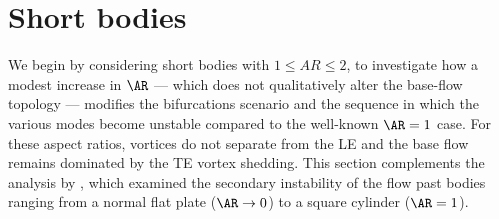 \section{Short bodies}
\label{sec:short}

We begin by considering short bodies with $1 \le AR \le 2$, to investigate how a modest increase in $\AR$ --- which does not qualitatively alter the base-flow topology --- modifies the bifurcations scenario and the sequence in which the various modes become unstable compared to the well-known $\AR=1$ case. For these aspect ratios, vortices do not separate from the LE and the base flow remains dominated by the TE vortex shedding. This section complements the analysis by \cite{choi-yang-2014}, which examined the secondary instability of the flow past bodies ranging from a normal flat plate ($\AR \rightarrow 0$) to a square cylinder ($\AR=1$).

